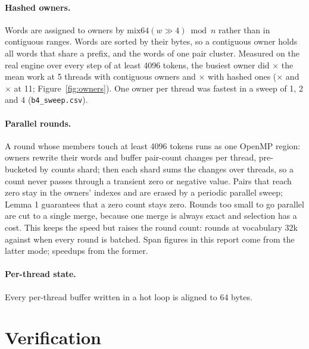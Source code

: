 \documentclass[11pt,a4paper]{article}
\newcommand{\code}[1]{\texttt{#1}}
\newcommand{\x}{$\times$}
\begin{document}
\paragraph{Hashed owners.} Words are assigned to owners by $\mathrm{mix64}(w \gg 4) \bmod n$ rather than in contiguous
ranges. Words are sorted by their bytes, so a contiguous owner holds all words that share a prefix, and the words of one
pair cluster. Measured on the real engine over every step of at least 4096 tokens, the busiest owner did
\loadContFive\x{} the mean work at 5 threads with contiguous owners and \loadHashFive\x{} with hashed ones
(\loadContEleven\x{} and \loadHashEleven\x{} at 11; Figure~\ref{fig:owners}). One owner per thread was fastest in a sweep of
1, 2 and 4 (\code{b4\_sweep.csv}).

\paragraph{Parallel rounds.} A round whose members touch at least 4096 tokens runs as one OpenMP region: owners rewrite
their words and buffer pair-count changes per thread, pre-bucketed by counts shard; then each shard sums the changes over
threads, so a count never passes through a transient zero or negative value. Pairs that reach zero stay in the owners'
indexes and are erased by a periodic parallel sweep; Lemma 1 guarantees that a zero count stays zero. Rounds too small to
go parallel are cut to a single merge, because one merge is always exact and selection has a cost. This keeps the speed
but raises the round count: \wtDefaultRounds{} rounds at vocabulary 32k against \wtRounds{} when every round is batched.
Span figures in this report come from the latter mode; speedups from the former.

\paragraph{Per-thread state.} Every per-thread buffer written in a hot loop is aligned to 64 bytes.

\section{Verification}
\end{document}
